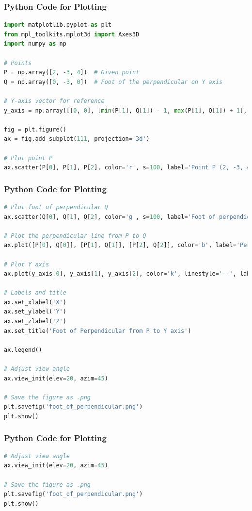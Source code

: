 \documentclass{beamer}
\numberwithin{equation}{section}
\begin{document}
\begin{frame}[fragile]
\frametitle{Python Code for Plotting}
\begin{lstlisting}[language=Python]
import matplotlib.pyplot as plt
from mpl_toolkits.mplot3d import Axes3D
import numpy as np

# Points
P = np.array([2, -3, 4])  # Given point
Q = np.array([0, -3, 0])  # Foot of the perpendicular on Y axis

# Y-axis vector for reference
y_axis = np.array([[0, 0], [min(P[1], Q[1]) - 1, max(P[1], Q[1]) + 1], [0, 0]])

fig = plt.figure()
ax = fig.add_subplot(111, projection='3d')

# Plot point P
ax.scatter(P[0], P[1], P[2], color='r', s=100, label='Point P (2, -3, 4)')

\end{lstlisting}

\end{frame}
\begin{frame}[fragile]
\frametitle{Python Code for Plotting}
\begin{lstlisting}[language=Python]
# Plot foot of perpendicular Q
ax.scatter(Q[0], Q[1], Q[2], color='g', s=100, label='Foot of perpendicular Q')

# Plot the perpendicular line from P to Q
ax.plot([P[0], Q[0]], [P[1], Q[1]], [P[2], Q[2]], color='b', label='Perpendicular')

# Plot Y axis
ax.plot(y_axis[0], y_axis[1], y_axis[2], color='k', linestyle='--', label='Y axis')

# Labels and title
ax.set_xlabel('X')
ax.set_ylabel('Y')
ax.set_zlabel('Z')
ax.set_title('Foot of Perpendicular from P to Y axis')

ax.legend()

# Adjust view angle
ax.view_init(elev=20, azim=45)

# Save the figure as .png
plt.savefig('foot_of_perpendicular.png')
plt.show()


\end{lstlisting}

\end{frame}
\begin{frame}[fragile]
\frametitle{Python Code for Plotting}
\begin{lstlisting}[language=Python]
# Adjust view angle
ax.view_init(elev=20, azim=45)

# Save the figure as .png
plt.savefig('foot_of_perpendicular.png')
plt.show()

\end{lstlisting}

\end{frame}
\end{document}
